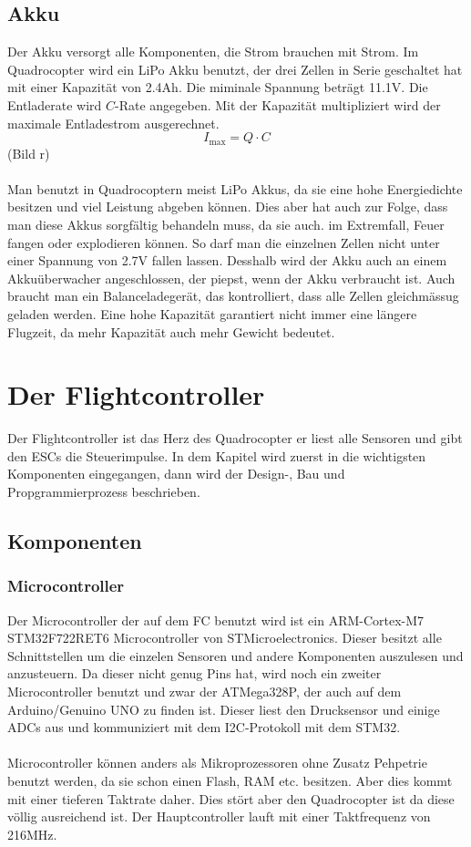 \documentclass[12pt,a4paper, ngerman]{article}
\begin{document}
\subsection{Akku}
Der Akku versorgt alle Komponenten, die Strom brauchen mit Strom. Im Quadrocopter wird ein LiPo Akku benutzt, der drei Zellen in Serie geschaltet hat mit einer Kapazität von 2.4Ah. Die miminale Spannung beträgt 11.1V. Die Entladerate wird $C$-Rate angegeben. Mit der Kapazität multipliziert wird der maximale Entladestrom ausgerechnet.\cite{website:fpvracing.ch_Mult_Komp}
\begin{equation}
I_{\text{max}}=Q\cdot C
\end{equation} (Bild r)\\ \\
Man benutzt in Quadrocoptern meist LiPo Akkus, da sie eine hohe Energiedichte besitzen und viel Leistung abgeben können. Dies aber hat auch zur Folge, dass man diese Akkus sorgfältig behandeln muss, da sie auch. im Extremfall, Feuer fangen oder explodieren können. So darf man die einzelnen Zellen nicht unter einer Spannung von 2.7V fallen lassen. Desshalb wird der Akku auch an einem Akkuüberwacher angeschlossen, der piepst, wenn der Akku verbraucht ist. Auch braucht man ein Balanceladegerät, das kontrolliert, dass alle Zellen gleichmässug geladen werden. Eine hohe Kapazität garantiert nicht immer eine längere Flugzeit, da mehr Kapazität auch mehr Gewicht bedeutet.\cite{website:fpvracing.ch_Mult_Komp}
\newpage

\section{Der Flightcontroller}
Der Flightcontroller ist das Herz des Quadrocopter er liest alle Sensoren und gibt den ESCs die Steuerimpulse. In dem Kapitel wird zuerst in die wichtigsten Komponenten eingegangen, dann wird der Design-, Bau und Propgrammierprozess beschrieben.
\subsection{Komponenten}
\subsubsection{Microcontroller}
Der Microcontroller der auf dem FC benutzt wird ist ein ARM-Cortex-M7 STM32F722RET6 Microcontroller von STMicroelectronics. Dieser besitzt alle Schnittstellen um die einzelen Sensoren und andere Komponenten auszulesen und anzusteuern. Da dieser nicht genug Pins hat, wird noch ein zweiter Microcontroller benutzt und zwar der ATMega328P, der auch auf dem Arduino/Genuino UNO zu finden ist. Dieser liest den Drucksensor und einige ADCs aus und kommuniziert mit dem I2C-Protokoll mit dem STM32. \\ \\
Microcontroller können anders als Mikroprozessoren ohne Zusatz Pehpetrie benutzt werden, da sie schon einen Flash, RAM etc. besitzen. Aber dies kommt mit einer tieferen Taktrate daher. Dies stört aber den Quadrocopter ist da diese völlig ausreichend ist. Der Hauptcontroller lauft mit einer Taktfrequenz von 216MHz.
\end{document}
